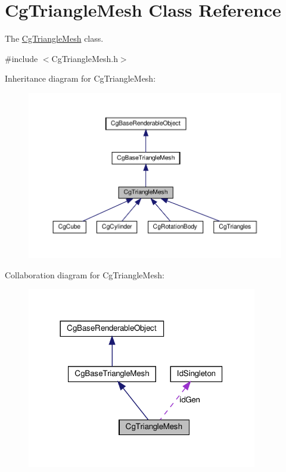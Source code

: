 \hypertarget{class_cg_triangle_mesh}{}\section{Cg\+Triangle\+Mesh Class Reference}
\label{class_cg_triangle_mesh}


The \hyperlink{class_cg_triangle_mesh}{Cg\+Triangle\+Mesh} class.  




{\ttfamily \#include $<$Cg\+Triangle\+Mesh.\+h$>$}



Inheritance diagram for Cg\+Triangle\+Mesh\+:
\nopagebreak
\begin{figure}[H]
\begin{center}
\leavevmode
\includegraphics[width=350pt]{class_cg_triangle_mesh__inherit__graph}
\end{center}
\end{figure}


Collaboration diagram for Cg\+Triangle\+Mesh\+:
\nopagebreak
\begin{figure}[H]
\begin{center}
\leavevmode
\includegraphics[width=284pt]{class_cg_triangle_mesh__coll__graph}
\end{center}
\end{figure}
